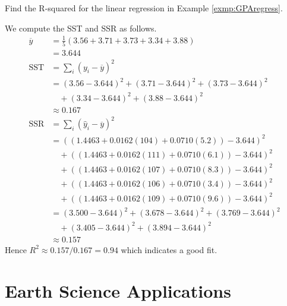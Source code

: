\begin{exmp}
\label{exmp:GPAregress2}
Find the R-squared for the linear regression in Example \ref{exmp:GPAregress}.
\end{exmp}
\begin{solution}
We compute the SST and SSR as follows.
\begin{align*}
\overline{y} &= \frac{1}{5}(3.56 + 3.71 + 3.73 + 3.34 + 3.88) \\
&= 3.644 \\
\text{SST} &= \sum_i (y_i - \overline{y})^2 \\
&= (3.56 - 3.644)^2 + (3.71 - 3.644)^2 + (3.73 - 3.644)^2 \\
&\quad + (3.34 - 3.644)^2 + (3.88 - 3.644)^2 \\
&\approx 0.167 \\
\text{SSR} &= \sum_i (\hat{y}_i - \overline{y})^2 \\
&= ((1.4463 + 0.0162(104)+ 0.0710(5.2)) - 3.644)^2 \\
&\quad + ((1.4463 + 0.0162(111)+ 0.0710(6.1)) - 3.644)^2 \\
&\quad + ((1.4463 + 0.0162(107)+ 0.0710(8.3)) - 3.644)^2 \\
&\quad + ((1.4463 + 0.0162(106)+ 0.0710(3.4)) - 3.644)^2 \\
&\quad + ((1.4463 + 0.0162(109)+ 0.0710(9.6)) - 3.644)^2 \\
&= (3.500 - 3.644)^2 + (3.678 - 3.644)^2 + (3.769 - 3.644)^2 \\
&\quad + (3.405 - 3.644)^2 + (3.894 - 3.644)^2 \\
&\approx 0.157
\end{align*}
Hence $R^2 \approx 0.157/0.167 = 0.94$ which indicates a good fit.
\end{solution}

\section{Earth Science Applications}

